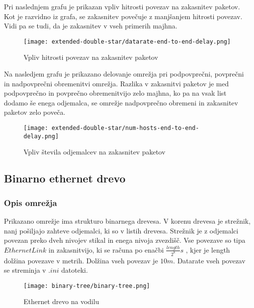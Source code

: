 Pri naslednjem grafu je prikazan vpliv hitrosti povezav na zakasnitev paketov. Kot je razvidno iz grafa, se zakasnitev povečuje z manjšanjem hitrosti povezav. Vidi pa se tudi, da je zakasnitev v vseh primerih majhna.

\begin{figure}[H]
    \centering
    \texttt{[image: extended-double-star/datarate-end-to-end-delay.png]}
    \caption{Vpliv hitrosti povezav na zakasnitev paketov} 
    \label{fig:datarate-end-to-end-delay-double-star}
\end{figure}

Na nasledjem grafu je prikazano delovanje omrežja pri podpovprečni, povprečni in nadpovprečni obremenitvi omrežja. Razlika v zakasnitvi paketov je med podpovprečno in povprečno obremenitvijo zelo majhna, ko pa na vsak list dodamo še enega odjemalca, se omrežje nadpovprečno obremeni in zakasnitev paketov zelo poveča.

\begin{figure}[H]
    \centering
    \texttt{[image: extended-double-star/num-hosts-end-to-end-delay.png]}
    \caption{Vpliv števila odjemalcev na zakasnitev paketov} 
    \label{fig:num-hosts-end-to-end-delay-double-star}
\end{figure}

\subsection{Binarno ethernet drevo}

\subsubsection{Opis omrežja}

Prikazano omrežje ima strukturo binarnega drevesa. V korenu drevesa je strežnik, nanj pošiljajo zahteve odjemalci, ki so v listih drevesa. Strežnik je z odjemalci povezan preko dveh nivojev stikal in enega nivoja zvezdišč. Vse povezave so tipa $EthernetLink$ in zakasnitvijo, ki se računa po enačbi $\frac{length}{2^8}s$ \cite{omnetpp}, kjer je length dolžina povezave v metrih. Dolžina vseh povezav je $10m$. Datarate vseh povezav se streminja v $.ini$ datoteki.

\begin{figure}[H]
    \centering
    \texttt{[image: binary-tree/binary-tree.png]}
    \caption{Ethernet drevo na vodilu}
    \label{fig:eth-tree}
\end{figure}

